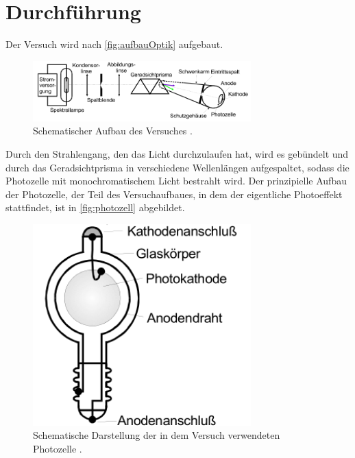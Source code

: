 \section{Durchführung}
\label{sec:Durchführung}

Der Versuch wird nach \autoref{fig:aufbauOptik} aufgebaut.
\begin{figure}[H]
    \centering
    \includegraphics[width = 0.75\textwidth]{data/optischerTeil.png}
    \caption{Schematischer Aufbau des Versuches \cite{Anleitung500}.}
    \label{fig:aufbauOptik}
\end{figure}
Durch den Strahlengang, den das Licht durchzulaufen hat, wird es gebündelt und durch das Geradsichtprisma in verschiedene Wellenlängen aufgespaltet, sodass
die Photozelle mit monochromatischem Licht bestrahlt wird. Der prinzipielle Aufbau der Photozelle, der Teil des Versuchaufbaues, in dem der eigentliche Photoeffekt
stattfindet, ist in \autoref{fig:photozell} abgebildet.
\begin{figure}[H]
    \centering
    \includegraphics[width = 0.75\textwidth]{data/photozelle.png}
    \caption{Schematische Darstellung der in dem Versuch verwendeten Photozelle \cite{Anleitung500}.}
    \label{fig:photozell}
\end{figure}
